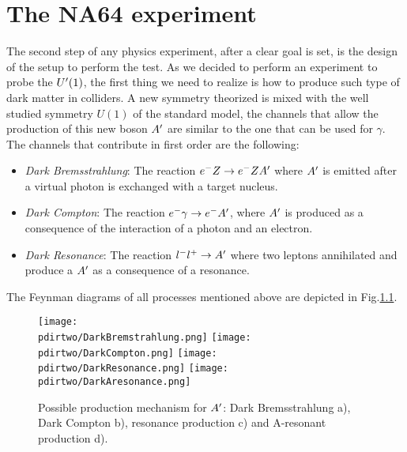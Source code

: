 
\newcommand{\pdirtwo}{chapters/plots/chapter2}

\chapter{The NA64 experiment} %

\label{chapter2} %


The second step of any physics experiment, after a clear goal is set, is the design of the setup to perform the test. As we decided to perform an experiment to probe the $U'(1)$, the first thing we need to realize is how to produce such type of dark matter in colliders. A new symmetry theorized is mixed with the well studied symmetry $U(1)$ of the standard model, the channels that allow the production of this new boson $A'$ are similar to the one that can be used for $\gamma$. The channels that contribute in first order are the following:

\begin{itemize}
\item \textit{Dark Bremsstrahlung}: The reaction $e^- Z \to e^- Z A'$ where $A'$ is emitted after a virtual photon is exchanged with a target nucleus.
\item \textit{Dark Compton}: The reaction $e^- \gamma \to e^- A'$, where $A'$ is produced as a consequence of the interaction of a photon and an electron.
\item \textit{Dark Resonance}: The reaction $l^- l^+ \to A'$ where two leptons annihilated and produce a $A'$ as a consequence of a resonance.
\end{itemize}

The Feynman diagrams of all processes mentioned above are depicted in Fig.\ref{fig:dm-production-mechanism}.

\begin{figure}
\centering
\texttt{[image: \\pdirtwo/DarkBremstrahlung.png]}
\texttt{[image: \\pdirtwo/DarkCompton.png]}
\texttt{[image: \\pdirtwo/DarkResonance.png]}
\texttt{[image: \\pdirtwo/DarkAresonance.png]}
\caption{Possible production mechanism for $A'$: Dark Bremsstrahlung a), Dark Compton b), resonance production c) and A-resonant production d).}
\label{fig:dm-production-mechanism}
\end{figure}

